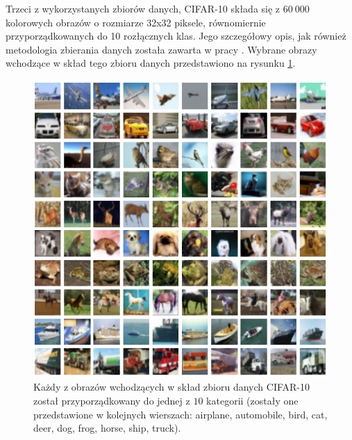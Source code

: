 \documentclass[12pt,a4paper,twoside]{article}
\begin{document}
Trzeci z wykorzystanych zbiorów danych, CIFAR-10 składa się z $60~000$ kolorowych obrazów o rozmiarze 32x32 piksele, równomiernie przyporządkowanych do 10 rozłącznych klas. Jego szczegółowy opis, jak również metodologia zbierania danych została zawarta w pracy \citet{krizhevsky2009}. Wybrane obrazy wchodzące w skład tego zbioru danych przedstawiono na rysunku \ref{fig:cifar_data}.

\begin{figure}[h]
  \centering
\includegraphics[scale=0.9]{../obrazy/fig:cifar_data.png}
\caption{Każdy z obrazów wchodzących w skład zbioru danych CIFAR-10 został przyporządkowany do jednej z $10$ kategorii (zostały one przedstawione w kolejnych wierszach: airplane, automobile, bird, cat, deer, dog, frog, horse, ship, truck).\label{fig:cifar_data}}
\end{figure}
\end{document}
